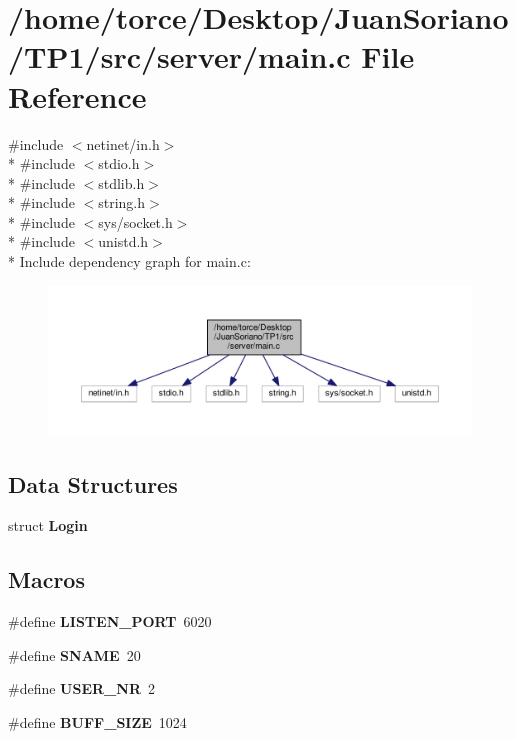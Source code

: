 \section{/home/torce/\+Desktop/\+Juan\+Soriano/\+T\+P1/src/server/main.c File Reference}
\label{server_2main_8c}
{\ttfamily \#include $<$netinet/in.\+h$>$}\\*
{\ttfamily \#include $<$stdio.\+h$>$}\\*
{\ttfamily \#include $<$stdlib.\+h$>$}\\*
{\ttfamily \#include $<$string.\+h$>$}\\*
{\ttfamily \#include $<$sys/socket.\+h$>$}\\*
{\ttfamily \#include $<$unistd.\+h$>$}\\*
Include dependency graph for main.\+c\+:
\nopagebreak
\begin{figure}[H]
\begin{center}
\leavevmode
\includegraphics[width=350pt]{server_2main_8c__incl}
\end{center}
\end{figure}
\subsection*{Data Structures}
\begin{DoxyCompactItemize}
\item 
struct {\bf Login}
\end{DoxyCompactItemize}
\subsection*{Macros}
\begin{DoxyCompactItemize}
\item 
\#define {\bf L\+I\+S\+T\+E\+N\+\_\+\+P\+O\+RT}~6020
\item 
\#define {\bf S\+N\+A\+ME}~20
\item 
\#define {\bf U\+S\+E\+R\+\_\+\+NR}~2
\item 
\#define {\bf B\+U\+F\+F\+\_\+\+S\+I\+ZE}~1024
\end{DoxyCompactItemize}
